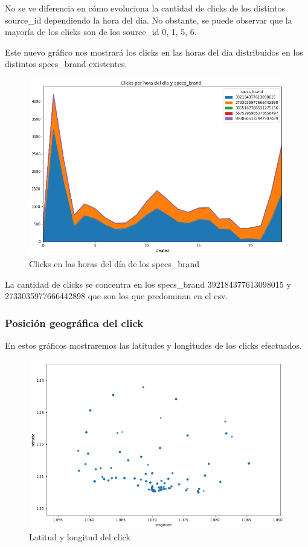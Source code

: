 \documentclass[a4paper, 12pt]{article}
\begin{document}
	
		 No se ve diferencia en cómo evoluciona la cantidad de clicks de los distintos source\_id dependiendo la hora del día. No obstante, se puede observar que la mayoría de los clicks son de los source\_id 0, 1, 5, 6.

		\clearpage
		 Este nuevo gráfico nos mostrará los clicks en las horas del día distribuidos en los distintos specs\_brand existentes.


		\begin{figure}[H]
			\centering
			\includegraphics[width=\textwidth]{images/clicks/clicks_specs_brand_hours.png}
			\caption{Clicks en las horas del día de los specs\_brand}
		\end{figure}


		 La cantidad de clicks se concentra en los specs\_brand 392184377613098015 y 2733035977666442898 que son los que predominan en el csv.
	
	\clearpage
	\subsubsection{Posición geográfica del click}
		
		 En estos gráficos mostraremos las latitudes y longitudes de los clicks efectuados.


		\begin{figure}[H]
			\centering
			\includegraphics[scale=0.48]{images/clicks/clicks_lat_long_scatter.png}
			\caption{Latitud y longitud del click}
		\end{figure}
\end{document}
